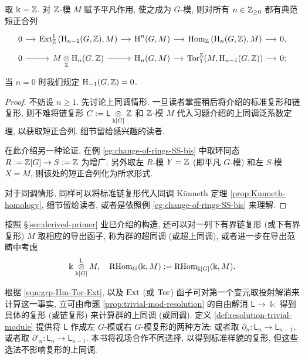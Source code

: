 \begin{proposition}[群同调与上同调的泛系数定理]\label{prop:group-UCT}
	取 $\Bbbk = \Z$. 对 $\Z$-模 $M$ 赋予平凡作用, 使之成为 $G$-模, 则对所有 $n \in \Z_{\geq 0}$ 都有典范短正合列
	\[\begin{tikzcd}[row sep=tiny, column sep=small]
		0 \arrow[r] & \Ext^1_{\Z}\left( \Hm_{n-1}(G, \Z), M \right) \arrow[r] & \Hm^n(G, M) \arrow[r] & \Hom_{\Z}\left( \Hm_n(G, \Z), M \right) \arrow[r] & 0, \\
		0 \arrow[r] & M \dotimes{\Z} \Hm_n(G, \Z) \arrow[r] & \Hm_n(G, M) \arrow[r] & \Tor^{\Z}_1(M, \Hm_{n-1}(G, \Z)) \arrow[r] & 0;
	\end{tikzcd}\]
	当 $n=0$ 时我们规定 $\Hm_{-1}(G, \Z) = 0$.
\end{proposition}
\begin{proof}
	不妨设 $n \geq 1$. 先讨论上同调情形. 一旦读者掌握稍后将介绍的标准复形和链复形, 则不难将链复形 $C := \mathsf{L} \dotimes{\Bbbk[G]} \Z$ 和 $\Z$-模 $M$ 代入习题介绍的上同调泛系数定理, 以获取短正合列. 细节留给感兴趣的读者.
	
	在此介绍另一种论证. 在例 \ref{eg:change-of-rings-SS-bis} 中取环同态 $R := \Z[G] \to S := \Z$ 为增广; 另外取左 $R$-模 $Y = \Z$ (即平凡 $G$-模) 和左 $S$-模 $X = M$, 则该处的短正合列化为所求形式.
	
	对于同调情形, 同样可以将标准链复形代入同调 Künneth 定理 \ref{prop:Kunneth-homology}, 细节留给读者, 或者是依照例 \ref{eg:change-of-rings-SS-bis} 来理解.
\end{proof}

按照 \S\ref{sec:derived-primer} 业已介绍的构造, 还可以对一列下有界链复形 (或下有界复形) $M$ 取相应的导出函子, 称为群的超同调 (或超上同调), 或者进一步在导出范畴中考虑
\[ \Bbbk \otimesL[{\Bbbk[G]}] M, \quad \RHom_G(\Bbbk, M) := \RHom_{\Bbbk[G]}(\Bbbk, M). \]

根据 \eqref{eqn:grp-Hm-Tor-Ext}, 以及 $\Ext$ (或 $\Tor$) 函子可对第一个变元取投射解消来计算这一事实, 立可由命题 \ref{prop:trivial-mod-resolution} 的自由解消 $\mathsf{L} \to \Bbbk$ 得到具体的复形 (或链复形) 来计算群的上同调 (或同调). 定义 \ref{def:resolution-trivial-module} 提供将 $\mathsf{L}$ 作成左 $G$-模或右 $G$-模复形的两种方法: 或者取 $\partial_n: \mathsf{L}_n \to \mathsf{L}_{n-1}$, 或者取 $\partial'_n: \mathsf{L}_n \to \mathsf{L}_{n-1}$. 本书将视场合作不同选择, 以得到标准样貌的复形, 但这些选法不影响复形的上同调.

